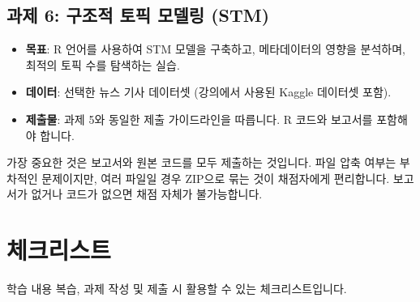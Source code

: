 \documentclass[11pt,a4paper]{article}
\theoremstyle{definition}
\begin{document}
{\subsection*{과제 6: 구조적 토픽 모델링 (STM)}
\begin{itemize}
    \item \textbf{목표}: R 언어를 사용하여 STM 모델을 구축하고, 메타데이터의 영향을 분석하며, 최적의 토픽 수를 탐색하는 실습.
    \item \textbf{데이터}: 선택한 뉴스 기사 데이터셋 (강의에서 사용된 Kaggle 데이터셋 포함).
    \item \textbf{제출물}: 과제 5와 동일한 제출 가이드라인을 따릅니다. R 코드와 보고서를 포함해야 합니다.
\end{itemize}

\begin{tcolorbox}[caution={제출물 누락 방지}]
가장 중요한 것은 보고서와 원본 코드를 모두 제출하는 것입니다. 파일 압축 여부는 부차적인 문제이지만, 여러 파일일 경우 ZIP으로 묶는 것이 채점자에게 편리합니다. 보고서가 없거나 코드가 없으면 채점 자체가 불가능합니다.
\end{tcolorbox}

\newpage
\section{체크리스트}
학습 내용 복습, 과제 작성 및 제출 시 활용할 수 있는 체크리스트입니다.

}
\end{document}
